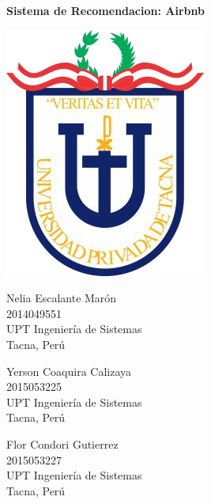 \documentclass[11pt,a4paper]{article}
\begin{document}
		
		\begin{center}
			\huge \textbf{Sistema de Recomendacion: Airbnb} 
		\end{center}
		\vspace{\baselineskip}
		\begin{center}
			\includegraphics[scale=0.37]{./Imagenes/logo}
		\end{center}
		\vspace{\baselineskip}
		\begin{multicols}{2}
			\small
			\begin{center}
				Nelia Escalante Marón\\
				2014049551\\
				UPT Ingeniería de Sistemas\\
				Tacna, Perú\\
				
				\vspace{\baselineskip}
				
				Yerson Coaquira Calizaya\\
				2015053225\\
				UPT Ingeniería de Sistemas\\  
				Tacna, Perú\\   
				\columnbreak              
				
				Flor Condori Gutierrez\\
				2015053227\\
				UPT Ingeniería de Sistemas\\  
				Tacna, Perú\\                 
				
				           
			\end{center}
			\normalsize			
		\end{multicols}
		\vspace{\baselineskip}
		\vspace{\baselineskip}
		\vspace{\baselineskip}
\end{document}
